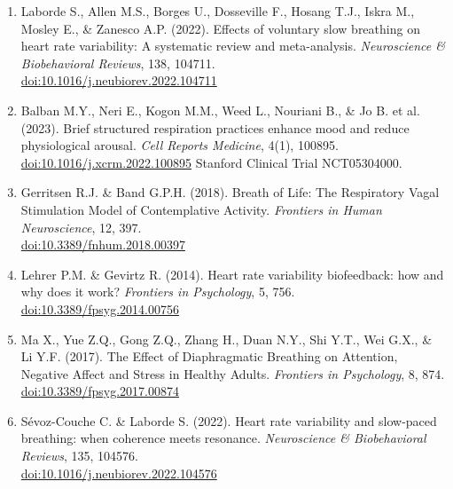 \documentclass[12pt,a4paper]{article}
\begin{document}
\begin{enumerate}[itemsep=4pt]

    \item Laborde S., Allen M.S., Borges U., Dosseville F., Hosang T.J.,
          Iskra M., Mosley E., \& Zanesco A.P. (2022). Effects of voluntary
          slow breathing on heart rate variability: A systematic review and
          meta-analysis. \textit{Neuroscience \& Biobehavioral Reviews}, 138,
          104711. \\
          \href{https://doi.org/10.1016/j.neubiorev.2022.104711}{doi:10.1016/j.neubiorev.2022.104711}

    \item Balban M.Y., Neri E., Kogon M.M., Weed L., Nouriani B., \& Jo B.
          et al. (2023). Brief structured respiration practices enhance mood
          and reduce physiological arousal. \textit{Cell Reports Medicine},
          4(1), 100895. \\
          \href{https://doi.org/10.1016/j.xcrm.2022.100895}{doi:10.1016/j.xcrm.2022.100895}
          Stanford Clinical Trial NCT05304000.

    \item Gerritsen R.J. \& Band G.P.H. (2018). Breath of Life: The
          Respiratory Vagal Stimulation Model of Contemplative Activity.
          \textit{Frontiers in Human Neuroscience}, 12, 397. \\
          \href{https://doi.org/10.3389/fnhum.2018.00397}{doi:10.3389/fnhum.2018.00397}

    \item Lehrer P.M. \& Gevirtz R. (2014). Heart rate variability
          biofeedback: how and why does it work? \textit{Frontiers in
          Psychology}, 5, 756. \\
          \href{https://doi.org/10.3389/fpsyg.2014.00756}{doi:10.3389/fpsyg.2014.00756}

    \item Ma X., Yue Z.Q., Gong Z.Q., Zhang H., Duan N.Y., Shi Y.T., Wei
          G.X., \& Li Y.F. (2017). The Effect of Diaphragmatic Breathing on
          Attention, Negative Affect and Stress in Healthy Adults.
          \textit{Frontiers in Psychology}, 8, 874. \\
          \href{https://doi.org/10.3389/fpsyg.2017.00874}{doi:10.3389/fpsyg.2017.00874}

    \item Sévoz-Couche C. \& Laborde S. (2022). Heart rate variability and
          slow-paced breathing: when coherence meets resonance.
          \textit{Neuroscience \& Biobehavioral Reviews}, 135, 104576. \\
          \href{https://doi.org/10.1016/j.neubiorev.2022.104576}{doi:10.1016/j.neubiorev.2022.104576}


\end{enumerate}
\end{document}
